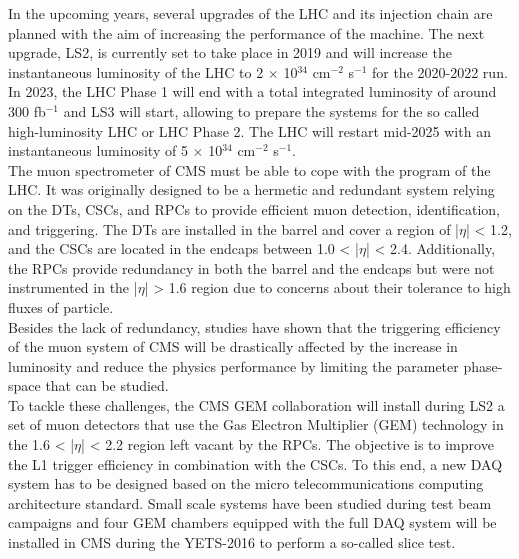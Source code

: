 
In the upcoming years, several upgrades of the LHC and its injection chain are planned with the aim of increasing the performance of the machine. The next upgrade, LS2, is currently set to take place in 2019 and will increase the instantaneous luminosity of the LHC to 2 $ \times $ 10$^{34}$ cm$^{-2}$ s$^{-1}$ for the 2020-2022 run. In 2023, the LHC Phase 1 will end with a total integrated luminosity of around 300 fb$^{-1}$ and LS3 will start, allowing to prepare the systems for the so called high-luminosity LHC or LHC Phase 2. The LHC will restart mid-2025 with an instantaneous luminosity of 5 $ \times $ 10$^{34}$ cm$^{-2}$ s$^{-1}$. \\

The muon spectrometer of CMS must be able to cope with the program of the LHC. It was originally designed to be a hermetic and redundant system relying on the DTs, CSCs, and RPCs to provide efficient muon detection, identification, and triggering. The DTs are installed in the barrel and cover a region of |$\eta$| < 1.2, and the CSCs are located in the endcaps between 1.0 < |$\eta$| < 2.4. Additionally, the RPCs provide redundancy in both the barrel and the endcaps but were not instrumented in the |$\eta$| > 1.6 region due to concerns about their tolerance to high fluxes of particle. \\

Besides the lack of redundancy, studies have shown that the triggering efficiency of the muon system of CMS will be drastically affected by the increase in luminosity and reduce the physics performance by limiting the parameter phase-space that can be studied. \\

To tackle these challenges, the CMS GEM collaboration \cite{Colaleo:2021453} will install during LS2 a set of muon detectors that use the Gas Electron Multiplier (GEM) technology in the 1.6 < |$\eta$| < 2.2 region left vacant by the RPCs. The objective is to improve the L1 trigger efficiency in combination with the CSCs. To this end, a new DAQ system has to be designed based on the micro telecommunications computing architecture standard. Small scale systems have been studied during test beam campaigns and four GEM chambers equipped with the full DAQ system will be installed in CMS during the YETS-2016 to perform a so-called slice test. \\

